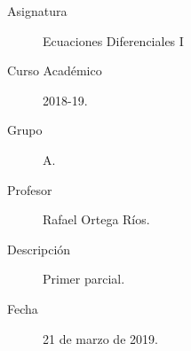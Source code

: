 \documentclass[12pt]{article}
\begin{document}

    
    

    \begin{description}
        \item[Asignatura] Ecuaciones Diferenciales I
        \item[Curso Académico] 2018-19.
        \item[Grupo] A.
        \item[Profesor] Rafael Ortega Ríos.
        \item[Descripción] Primer parcial.
        \item[Fecha] 21 de marzo de 2019.
    
    \end{description}
    \newpage
\end{document}
